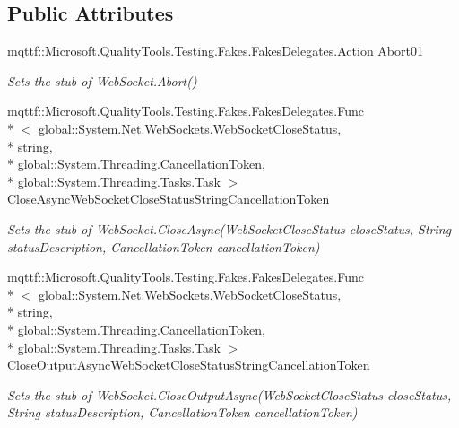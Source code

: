 \subsection*{Public Attributes}
\begin{DoxyCompactItemize}
\item 
mqttf\-::\-Microsoft.\-Quality\-Tools.\-Testing.\-Fakes.\-Fakes\-Delegates.\-Action \hyperlink{class_system_1_1_net_1_1_web_sockets_1_1_fakes_1_1_stub_web_socket_ac7a1e0526e713fc41d5e5649e8425e19}{Abort01}
\begin{DoxyCompactList}\small\item\em Sets the stub of Web\-Socket.\-Abort()\end{DoxyCompactList}\item 
mqttf\-::\-Microsoft.\-Quality\-Tools.\-Testing.\-Fakes.\-Fakes\-Delegates.\-Func\\*
$<$ global\-::\-System.\-Net.\-Web\-Sockets.\-Web\-Socket\-Close\-Status, \\*
string, \\*
global\-::\-System.\-Threading.\-Cancellation\-Token, \\*
global\-::\-System.\-Threading.\-Tasks.\-Task $>$ \hyperlink{class_system_1_1_net_1_1_web_sockets_1_1_fakes_1_1_stub_web_socket_a80c223a9ef0c5ce77d7ebf9132eef51c}{Close\-Async\-Web\-Socket\-Close\-Status\-String\-Cancellation\-Token}
\begin{DoxyCompactList}\small\item\em Sets the stub of Web\-Socket.\-Close\-Async(\-Web\-Socket\-Close\-Status close\-Status, String status\-Description, Cancellation\-Token cancellation\-Token)\end{DoxyCompactList}\item 
mqttf\-::\-Microsoft.\-Quality\-Tools.\-Testing.\-Fakes.\-Fakes\-Delegates.\-Func\\*
$<$ global\-::\-System.\-Net.\-Web\-Sockets.\-Web\-Socket\-Close\-Status, \\*
string, \\*
global\-::\-System.\-Threading.\-Cancellation\-Token, \\*
global\-::\-System.\-Threading.\-Tasks.\-Task $>$ \hyperlink{class_system_1_1_net_1_1_web_sockets_1_1_fakes_1_1_stub_web_socket_a33b410a632483aa661b7ee8a68bcaa1a}{Close\-Output\-Async\-Web\-Socket\-Close\-Status\-String\-Cancellation\-Token}
\begin{DoxyCompactList}\small\item\em Sets the stub of Web\-Socket.\-Close\-Output\-Async(\-Web\-Socket\-Close\-Status close\-Status, String status\-Description, Cancellation\-Token cancellation\-Token)\end{DoxyCompactList}\item 

\end{DoxyCompactItemize}
